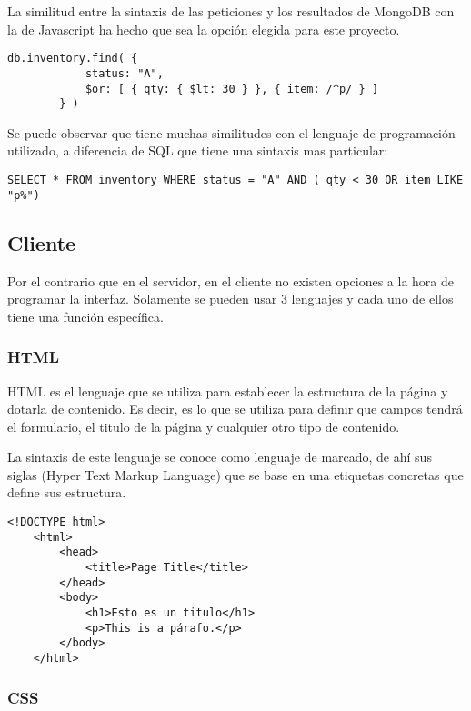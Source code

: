 La similitud entre la sintaxis de las peticiones y los resultados de MongoDB con la de Javascript ha hecho que sea la opción elegida para este proyecto.

\begin{lstlisting}[style=ES6, caption={Ejemplo de una petición en MongoDB}]
		db.inventory.find( {
     		status: "A",
     		$or: [ { qty: { $lt: 30 } }, { item: /^p/ } ]
		} )
\end{lstlisting}

Se puede observar que tiene muchas similitudes con el lenguaje de programación utilizado, a diferencia de SQL que tiene una sintaxis mas particular:

\begin{lstlisting}[style=ES6, caption={Ejemplo de una petición en SQL}]
		SELECT * FROM inventory WHERE status = "A" AND ( qty < 30 OR item LIKE "p%")
\end{lstlisting}

\subsection{Cliente}

Por el contrario que en el servidor, en el cliente no existen opciones a la hora de programar la interfaz. Solamente se pueden usar 3 lenguajes y cada uno de ellos tiene una función específica.

\subsubsection{HTML}

HTML es el lenguaje que se utiliza para establecer la estructura de la página y dotarla de contenido. Es decir, es lo que se utiliza para definir que campos tendrá el formulario, el titulo de la página y cualquier otro tipo de contenido.

La sintaxis de este lenguaje se conoce como lenguaje de marcado, de ahí sus siglas (Hyper Text Markup Language) que se base en una etiquetas concretas que define sus estructura.
\begin{lstlisting}[style=ES6, caption={Ejemplo de una petición en SQL}]
	<!DOCTYPE html>
	<html>
		<head>
			<title>Page Title</title>
		</head>
		<body>
			<h1>Esto es un titulo</h1>
			<p>This is a párafo.</p>
		</body>
	</html> 
\end{lstlisting}

\subsubsection{CSS}

